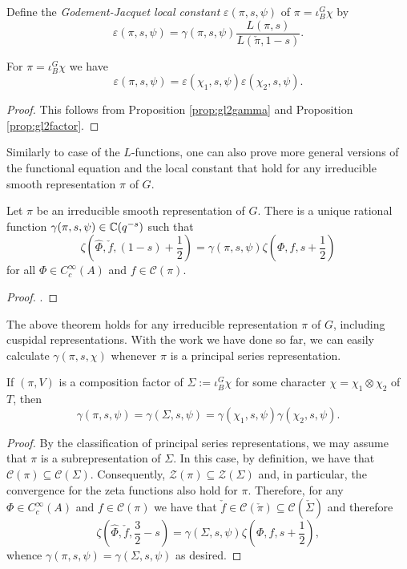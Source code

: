 \begin{defn}
    Define the \textit{Godement-Jacquet local constant} $\varepsilon(\pi,s,\psi)$ of $\pi = \iota_B^G \chi$ by 
    $$\varepsilon(\pi,s,\psi) = \gamma(\pi,s,\psi) \frac{L(\pi,s)}{L(\check{\pi},1-s)}.$$
\end{defn}

\begin{cor}
    For $\pi= \iota_B^G \chi$ we have
    $$\varepsilon(\pi,s,\psi) = \varepsilon(\chi_1,s,\psi)\varepsilon(\chi_2,s,\psi).$$
\end{cor}
\begin{proof}
    This follows from Proposition \ref{prop:gl2gamma} and Proposition \ref{prop:gl2factor}.
\end{proof}

Similarly to case of the $L$-functions, one can also prove more general versions of the functional equation and the local constant that hold for any irreducible smooth representation $\pi$ of $G$.


\begin{thm}\label{BHThm2}
    Let $\pi$ be an irreducible smooth representation of $G$. There is a unique rational function $\gamma(\pi,s,\psi) \in \mathbb{C}(q^{-s})$ such that 
    $$\zeta\left(\hat\Phi,\check{f},(1-s)+\frac{1}{2}\right) = \gamma(\pi,s,\psi) \zeta\left(\Phi,f,s+\frac{1}{2}\right)$$ for all $\Phi \in C_c^\infty(A)$ and $f \in \mathcal C(\pi)$.
\end{thm}
\begin{proof}
    \cite[Theorem 24.2.2]{BH1}.
\end{proof}

The above theorem holds for any irreducible representation $\pi$ of $G$, including cuspidal representations. With the work we have done so far, we can easily calculate $\gamma(\pi,s,\chi)$ whenever $\pi$ is a principal series representation.


\begin{lemma}
    If $(\pi,V)$ is a composition factor of $\Sigma:=\iota_B^G\chi$ for some character $\chi=\chi_1\otimes\chi_2$ of $T$, then
    $$\gamma(\pi,s,\psi)=\gamma\left(\Sigma,s,\psi\right)=\gamma(\chi_1,s,\psi)\gamma(\chi_2,s,\psi).$$
\end{lemma}

\begin{proof}
    By the classification of principal series representations, we may assume that $\pi$ is a subrepresentation of $\Sigma$. In this case, by definition, we have that $\mathcal{C}(\pi)\subseteq\mathcal{C}(\Sigma)$. Consequently, $\mathcal{Z}(\pi)\subseteq\mathcal{Z}(\Sigma)$ and, in particular, the convergence for the zeta functions also hold for $\pi$. Therefore, for any $\Phi\in C_c^\infty(A)$ and $f\in\mathcal{C}(\pi)$ we have that $\check{f}\in\mathcal{C}(\check{\pi})\subseteq\mathcal{C}(\check{\Sigma})$ and therefore
    $$\zeta\left(\hat{\Phi},\check{f},\frac{3}{2}-s\right)=\gamma(\Sigma,s,\psi)\zeta\left(\Phi,f,s+\frac{1}{2}\right),$$
    whence $\gamma(\pi,s,\psi)=\gamma\left(\Sigma,s,\psi\right)$ as desired.
\end{proof}

